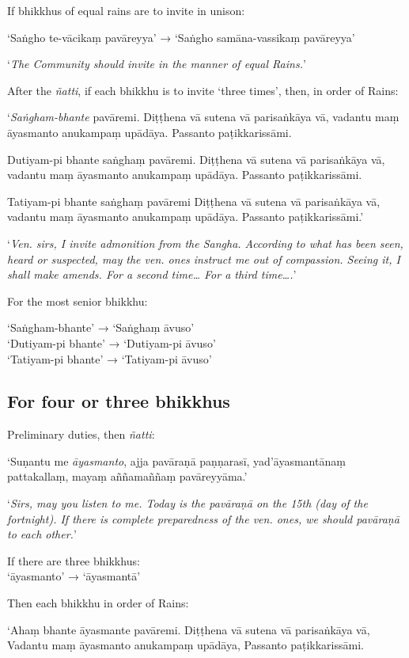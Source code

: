 If bhikkhus of equal rains are to invite in unison:

‘Saṅgho te-vācikaṃ pavāreyya’ → ‘Saṅgho samāna-vassikaṃ pavāreyya’

‘\emph{The Community should invite in the manner of equal Rains.}’

After the \emph{ñatti}, if each bhikkhu is to invite ‘three times’, then, in
order of Rains:

‘\emph{Saṅgham-bhante} pavāremi. Diṭṭhena vā sutena vā parisaṅkāya vā, vadantu
maṃ āyasmanto anukampaṃ upādāya. Passanto paṭikkarissāmi.

Dutiyam-pi bhante saṅghaṃ pavāremi. Diṭṭhena vā sutena vā parisaṅkāya vā,
vadantu maṃ āyasmanto anukampaṃ upādāya. Passanto paṭikkarissāmi.

Tatiyam-pi bhante saṅghaṃ pavāremi Diṭṭhena vā sutena vā parisaṅkāya vā, vadantu
maṃ āyasmanto anukampaṃ upādāya. Passanto paṭikkarissāmi.’

‘\emph{Ven. sirs, I invite admonition from the Sangha. According to what has
  been seen, heard or suspected, may the ven. ones instruct me out of
  compassion. Seeing it, I shall make amends. For a second time… For a third
  time….}’

For the most senior bhikkhu:

‘Saṅgham-bhante’ → ‘Saṅghaṃ āvuso’\\
‘Dutiyam-pi bhante’ → ‘Dutiyam-pi āvuso’\\
‘Tatiyam-pi bhante’ → ‘Tatiyam-pi āvuso’

\subsection{For four or three bhikkhus}

Preliminary duties, then \emph{ñatti}:

‘Suṇantu me \emph{āyasmanto}, ajja pavāraṇā paṇṇarasī, yad'āyasmantānaṃ
pattakallaṃ, mayaṃ aññamaññaṃ pavāreyyāma.’

‘\emph{Sirs, may you listen to me. Today is the pavāraṇā on the 15th (day of the
fortnight). If there is complete preparedness of the ven. ones, we should
pavāraṇā to each other.}’


If there are three bhikkhus:\\
‘āyasmanto’ → ‘āyasmantā’

Then each bhikkhu in order of Rains:

‘Ahaṃ bhante āyasmante pavāremi. Diṭṭhena vā sutena vā parisaṅkāya vā, Vadantu
maṃ āyasmanto anukampaṃ upādāya, Passanto paṭikkarissāmi.

